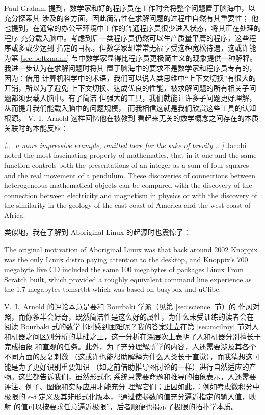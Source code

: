 Paul Graham 提到，数学家和好的程序员在工作时会将整个问题置于脑海中，以充分探索其
涉及的各方面，因此简洁性在求解问题的过程中自然有其重要性；
他也提到，在通常的办公室环境中工作的普通程序员很少进入状态，将其正在处理的程序
充分载入脑中。考虑到后一类程序员仍然可以生产质量平庸的程序，这些程序或多或少达到
指定的目标，但数学家却常常无福享受这种宽松待遇，这或许能为第 \ref{sec:boltzmann}
节中数学家显得比程序员更极简主义的现象提供一种解释。我进一步认为在求解问题时将其
置于脑海中的要求不是数学家和程序员专有的，因为：借用
计算机科学中的术语，我们可以说人类思维中“上下文切换”有很大的开销，所以为了避免
上下文切换、达成优良的性能，被求解问题的所有相关子问题都须要载入脑中。有了简洁
但强大的工具，我们就能让许多子问题更好理解，从而提升我们能载入脑中的问题规模，
而我相信这就是我们欣赏这些工具的认知根源。 V.~I.\ Arnold 这样回忆他在被教到
看起来无关的数学概念之间存在的本质关联时的本能反应：
\begin{quoting}
	\emph{[... a more impressive example, omitted here for the sake of
	brevity ...]} Jacobi noted the most fascinating property of mathematics,
	that in it one and the same function controls both the presentations of
	an integer as a sum of four squares and the real movement of a pendulum.
	These discoveries of connections between heterogeneous mathematical objects
	can be compared with the discovery of the connection between electricity
	and magnetism in physics or with the discovery of the similarity in
	the geology of the east coast of America and the west coast of Africa.
\end{quoting}
类似地，我在了解到 Aboriginal Linux 的起源时也震惊了：
\begin{quoting}
	The original motivation of Aboriginal Linux was that back around
	2002 Knoppix was the only Linux distro paying attention to the
	desktop, and Knoppix's 700 megabyte live CD included the same
	100 megabytes of packages Linux From Scratch built, which
	provided a roughly equivalent command line experience as the
	1.7 megabytes tomsrtbt which was based on busybox and uClibc.
\end{quoting}

V.~I.\ Arnold 的评论本意是要和 Bourbaki 学派（见第 \ref{sec:science} 节）的
作风对照，而你多半会好奇，既然简洁性是这么好的属性，为什么未受训练的读者会在
阅读 Bourbaki 式的数学书时感到困难呢？我的答案建立在第 \ref{sec:mcilroy} 节对人
和机器之间区别分析的基础之上，这一分析在深层次上表明了人和机器分别擅长于完成抽象
和直观的任务。此外，为了充分理解所学的内容，人还需要涉及其各个不同方面的反复刺激
（这或许也能帮助解释为什么人类长于直觉），而我猜想这可能是为了更好识别重要知识
（如之前借助推导图讨论的一样）进行自然适应的产物。这些都告诉我们，虽然形式化
系统只需要命题和推导的抽象表示，人还需要评注、例子、图像和实际应用才能充分
理解它们；正因如此，：例如考虑微积分中极限的 $\epsilon$-$\delta$
定义及其非形式化版本，“通过使参数的值充分逼近指定的输入值，映射
的值可以按要求任意逼近极限”，后者顺便也揭示了极限的拓扑学本质。

